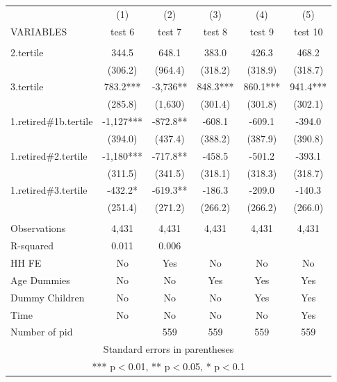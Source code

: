 \begin{tabular}{lccccc} \hline
 & (1) & (2) & (3) & (4) & (5) \\
VARIABLES & test 6 & test 7 & test 8 & test 9 & test 10 \\ \hline
 &  &  &  &  &  \\
2.tertile & 344.5 & 648.1 & 383.0 & 426.3 & 468.2 \\
 & (306.2) & (964.4) & (318.2) & (318.9) & (318.7) \\
3.tertile & 783.2*** & -3,736** & 848.3*** & 860.1*** & 941.4*** \\
 & (285.8) & (1,630) & (301.4) & (301.8) & (302.1) \\
1.retired\#1b.tertile & -1,127*** & -872.8** & -608.1 & -609.1 & -394.0 \\
 & (394.0) & (437.4) & (388.2) & (387.9) & (390.8) \\
1.retired\#2.tertile & -1,180*** & -717.8** & -458.5 & -501.2 & -393.1 \\
 & (311.5) & (341.5) & (318.1) & (318.3) & (318.7) \\
1.retired\#3.tertile & -432.2* & -619.3** & -186.3 & -209.0 & -140.3 \\
 & (251.4) & (271.2) & (266.2) & (266.2) & (266.0) \\
 &  &  &  &  &  \\
Observations & 4,431 & 4,431 & 4,431 & 4,431 & 4,431 \\
R-squared & 0.011 & 0.006 &  &  &  \\
HH FE & No & Yes & No & No & No \\
Age Dummies & No & No & Yes & Yes & Yes \\
Dummy Children & No & No & No & Yes & Yes \\
Time & No & No & No & No & Yes \\
 Number of pid &  & 559 & 559 & 559 & 559 \\ \hline
\multicolumn{6}{c}{ Standard errors in parentheses} \\
\multicolumn{6}{c}{ *** p$<$0.01, ** p$<$0.05, * p$<$0.1} \\
\end{tabular}
